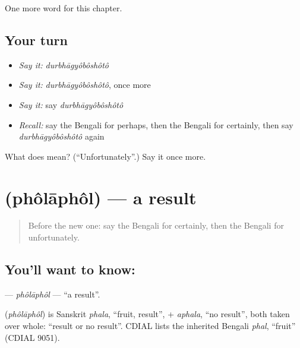 \begin{grammarlens}[title={What you've built}]
One more word for this chapter.
\end{grammarlens}

\subsection*{Your turn}
\begin{itemize}
\raggedright
  \item \emph{Say it:} \emph{durbhāgyôbôshôtô}
  \item \emph{Say it:} \emph{durbhāgyôbôshôtô}, once more
  \item \emph{Say it:} say \emph{durbhāgyôbôshôtô}
  \item \emph{Recall:} say the Bengali for perhaps, then the Bengali for certainly, then say \emph{durbhāgyôbôshôtô} again
\end{itemize}

\begin{tcolorbox}[breakable,colback=teal!4,colframe=teal!35!black,title={Before you move on}]
What does  mean? (\textquotedblleft{}Unfortunately\textquotedblright{}.) Say it once more.
\end{tcolorbox}
\section[\texorpdfstring{\bn{ফলাফল} (phôlāphôl)}{ফলাফল (phôlāphôl)}]{ (phôlāphôl) — a result}

\label{lesson:BN-C190-pholaphol}



\begin{quote}
Before the new one: say the Bengali for certainly, then the Bengali for unfortunately.
\end{quote}

\subsection*{You'll want to know: }
\textbf{} — \emph{phôlāphôl} — \textquotedblleft{}a result\textquotedblright{}.

\begin{cousinweb}
\textbf{} (\emph{phôlāphôl}) is Sanskrit \emph{phala}, \textquotedblleft{}fruit, result\textquotedblright{}, + \emph{aphala}, \textquotedblleft{}no result\textquotedblright{}, both taken over whole: \textquotedblleft{}result or no result\textquotedblright{}. CDIAL lists the inherited Bengali \emph{phal}, \textquotedblleft{}fruit\textquotedblright{} (CDIAL 9051).
\end{cousinweb}

